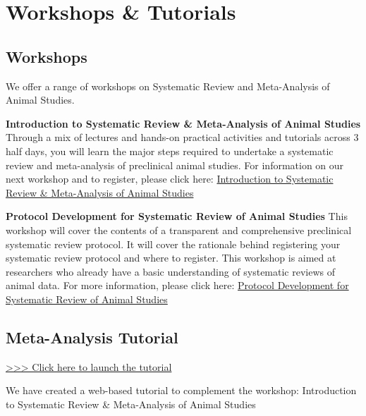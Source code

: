 \documentclass[
]{book}
\begin{document}
\hypertarget{workshops}{%
\chapter{Workshops \& Tutorials}\label{workshops}}

\hypertarget{workshops-1}{%
\section{Workshops}\label{workshops-1}}

We offer a range of workshops on Systematic Review and Meta-Analysis of Animal Studies.

\textbf{Introduction to Systematic Review \& Meta-Analysis of Animal Studies}
Through a mix of lectures and hands-on practical activities and tutorials across 3 half days, you will learn the major steps required to undertake a systematic review and meta-analysis of preclinical animal studies. For information on our next workshop and to register, please click here: \href{https://www.bihealth.org/en/translation/innovation-enabler/quest-center/mission-approaches/education-and-training/how-to-conduct-a-preclinical-animal-systematic-review-and-meta-analysi}{Introduction to Systematic Review \& Meta-Analysis of Animal Studies}

\textbf{Protocol Development for Systematic Review of Animal Studies}
This workshop will cover the contents of a transparent and comprehensive preclinical systematic review protocol. It will cover the rationale behind registering your systematic review protocol and where to register. This workshop is aimed at researchers who already have a basic understanding of systematic reviews of animal data. For more information, please click here: \href{https://www.bihealth.org/en/translation/innovation-enabler/quest-center/mission-approaches/education-and-training/protocol-development-for-systematic-review-of-animal-studies}{Protocol Development for Systematic Review of Animal Studies}

\hypertarget{meta-analysis-tutorial}{%
\section{Meta-Analysis Tutorial}\label{meta-analysis-tutorial}}

\href{https://s-quest.bihealth.org/CAMARADES_MA/}{\textgreater\textgreater\textgreater{} Click here to launch the tutorial}

We have created a web-based tutorial to complement the workshop:
Introduction to Systematic Review \& Meta-Analysis of Animal Studies
\end{document}
